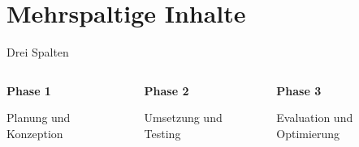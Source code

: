 \documentclass[aspectratio=169,10pt]{beamer}
\begin{document}
\section{Mehrspaltige Inhalte}
\begin{frame}{Drei Spalten}
\begin{columns}[T]
  \begin{column}{0.3\textwidth}
    \centering
    \textbf{\textcolor{HMRed}{Phase 1}}
    
    \vspace{0.3cm}
    Planung und Konzeption
  \end{column}
  \begin{column}{0.3\textwidth}
    \centering
    \textbf{\textcolor{HMRed}{Phase 2}}
    
    \vspace{0.3cm}
    Umsetzung und Testing
  \end{column}
  \begin{column}{0.3\textwidth}
    \centering
    \textbf{\textcolor{HMRed}{Phase 3}}
    
    \vspace{0.3cm}
    Evaluation und Optimierung
  \end{column}
\end{columns}
\end{frame}
\end{document}
